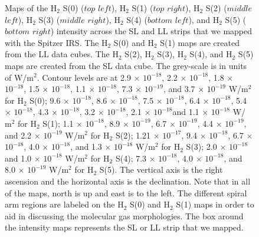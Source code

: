 \documentclass[manuscript]{aastex}
\begin{document}
\begin{figure}
\caption{Maps of the $\mathrm{H_2}$ S(0) ($top$ $left$), $\mathrm{H_2}$ S(1) ($top$ $right$), $\mathrm{H_2}$ S(2) ($middle$ $left$), $\mathrm{H_2}$ S(3) ($middle$ $right$), $\mathrm{H_2}$ S(4) ($bottom$ $left$), and $\mathrm{H_2}$ S(5) ($bottom$ $right$) intensity across the SL and LL strips that we mapped with the Spitzer IRS.  The $\mathrm{H_2}$ S(0) and $\mathrm{H_2}$ S(1) maps are created from the LL data cubes. 
The $\mathrm{H_2}$ S(2), $\mathrm{H_2}$ S(3), $\mathrm{H_2}$ S(4), and $\mathrm{H_2}$ S(5) maps are created from the SL data cube.  
The grey-scale is in units of W/$\mathrm{m^2}$.  Contour levels are at 2.9 $\times$ ${10^{-18}}$, 2.2 $\times$ ${10^{-18}}$, 1.8 $\times$ ${10^{-18}}$, 1.5 $\times$ ${10^{-18}}$, 1.1 $\times$ ${10^{-18}}$, 7.3 $\times$ ${10^{-19}}$, and 3.7 $\times$ ${10^{-19}}$ W/$\mathrm{m^2}$ for $\mathrm{H_2}$ S(0); 9.6 $\times$ ${10^{-18}}$, 8.6 $\times$ ${10^{-18}}$, 7.5 $\times$ ${10^{-18}}$, 6.4 $\times$ ${10^{-18}}$, 5.4 $\times$ ${10^{-18}}$, 4.3 $\times$ ${10^{-18}}$, 3.2 $\times$ ${10^{-18}}$, 2.1 $\times$ ${10^{-18}}$and 1.1 $\times$ ${10^{-18}}$ W/$\mathrm{m^2}$ for $\mathrm{H_2}$ S(1); 1.1 $\times$ ${10^{-18}}$, 8.9 $\times$ ${10^{-19}}$, 6.7 $\times$ ${10^{-19}}$, 4.4 $\times$ ${10^{-19}}$, and 2.2 $\times$ ${10^{-19}}$ W/$\mathrm{m^2}$ for $\mathrm{H_2}$ S(2); 1.21 $\times$ ${10^{-17}}$, 9.4 $\times$ ${10^{-18}}$, 6.7 $\times$ ${10^{-18}}$, 4.0 $\times$ ${10^{-18}}$, and 1.3 $\times$ ${10^{-18}}$ W/$\mathrm{m^2}$ for $\mathrm{H_2}$ S(3);  2.0 $\times$ ${10^{-18}}$and 1.0 $\times$ ${10^{-18}}$ W/$\mathrm{m^2}$ for $\mathrm{H_2}$ S(4); 7.3 $\times$ ${10^{-18}}$, 4.0 $\times$ ${10^{-18}}$, and 8.0 $\times$ ${10^{-19}}$ W/$\mathrm{m^2}$ for $\mathrm{H_2}$ S(5).  The vertical axis is the right ascension and the horizontal axis is the declination.  Note that in all of the maps, north is up and east is to the left.  The different spiral arm regions are labeled on the $\mathrm{H_2}$ S(0) and $\mathrm{H_2}$ S(1) maps in order to aid in discussing the molecular gas morphologies.  The box around the intensity maps represents the SL or LL strip that we mapped.\label{fig1}}


\end{figure}
\clearpage
\end{document}
